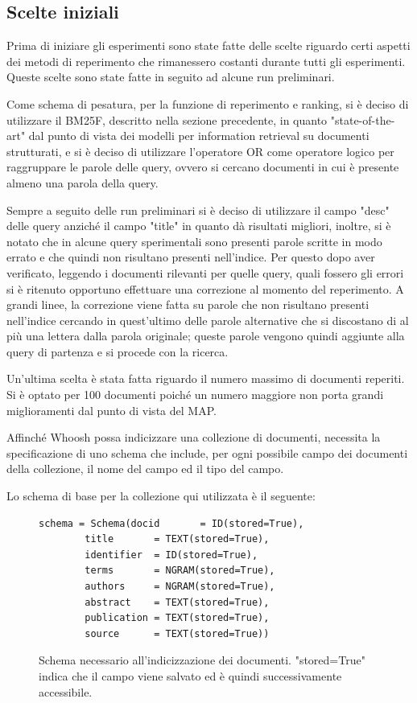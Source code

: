 \documentclass[runningheads]{llncs}
\begin{document}
\subsection{Scelte iniziali}

Prima di iniziare gli esperimenti sono state fatte delle scelte riguardo certi aspetti dei metodi di reperimento che rimanessero costanti durante tutti gli esperimenti.
Queste scelte sono state fatte in seguito ad alcune run preliminari.

Come schema di pesatura, per la funzione di reperimento e ranking,  si \`e deciso di utilizzare il BM25F, descritto nella sezione precedente, in quanto "state-of-the-art" dal punto di vista dei modelli per information retrieval su documenti strutturati, e si \`e deciso di utilizzare l'operatore OR come operatore logico per raggruppare le parole delle query, ovvero si cercano documenti in cui \`e presente almeno una parola della query.

Sempre a seguito delle run preliminari si \`e deciso di utilizzare il campo "desc" delle query anzich\'e il campo "title" in quanto d\`a risultati migliori, inoltre, si \`e notato che in alcune query sperimentali sono presenti parole scritte in modo errato e che quindi non risultano presenti nell'indice.
Per questo dopo aver verificato, leggendo i documenti rilevanti per quelle query, quali fossero gli errori si \`e ritenuto opportuno effettuare una correzione al momento del reperimento.
A grandi linee, la correzione viene fatta su parole che non risultano presenti nell'indice cercando in quest'ultimo delle parole alternative che si discostano di al pi\`u una lettera dalla parola originale; queste parole vengono quindi aggiunte alla query di partenza e si procede con la ricerca.

Un'ultima scelta \`e stata fatta riguardo il numero massimo di documenti reperiti.
Si \`e optato per 100 documenti poich\'e un numero maggiore non porta grandi miglioramenti dal punto di vista del MAP. \par

Affinch\'e Whoosh possa indicizzare una collezione di documenti, necessita la
specificazione di uno schema che include, per ogni possibile campo dei documenti della collezione, il nome del campo ed il tipo del campo.

Lo schema di base per la collezione qui utilizzata \`e il seguente:
\par

\begin{figure}
\begin{lstlisting}
schema = Schema(docid      	= ID(stored=True),
		title      	= TEXT(stored=True),
		identifier	= ID(stored=True),
		terms 		= NGRAM(stored=True),
		authors		= NGRAM(stored=True),
		abstract 	= TEXT(stored=True),
		publication	= TEXT(stored=True),
		source 		= TEXT(stored=True))
\end{lstlisting}
      \caption{Schema necessario all'indicizzazione dei documenti. "stored=True" indica che il campo viene salvato ed \`e quindi successivamente accessibile. }
\end{figure}
\end{document}
